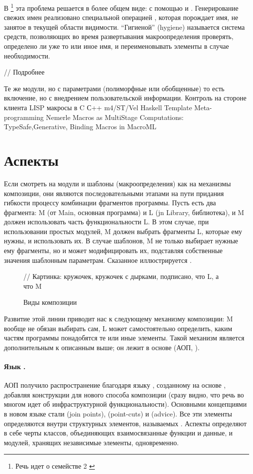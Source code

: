 {В \footnote{Речь идет о семействе  2 \cite{???}} эта проблема решается в более общем виде: с помощью  и . Генерирование свежих имен реализовано специальной операцией , которая порождает имя, не занятое в текущей области видимости. ``Гигиеной'' (hygiene) называется система средств, позволяющих во время развертывания макроопределения проверять, определено ли уже то или иное имя, и переименовывать элементы в случае необходимости.

// Подробнее



Те же модули, но с параметрами (полиморфные или обобщенные)
	то есть включение, но с внедрением пользовательской информации. Контроль на стороне клиента
	LISP
	макросы в C
	С++
	m4/ST/Vel
	Haskell Template Meta-programming
	Nemerle
	Macros as MultiStage Computations: TypeSafe,Generative, Binding Macros in MacroML
}	
\section{Аспекты}

Если смотреть на модули и шаблоны (макроопределения) как на механизмы композиции, они являются последовательными этапами на пути придания гибкости процессу комбинации фрагментов программы. Пусть есть два фрагмента: M (от Main, основная программа) и L (jn Library, библиотека), и M должен использовать часть функциональности L. В этом случае, при использовании простых модулей, M должен выбрать фрагменты L, которые ему нужны, и использовать их. В случае шаблонов, M не только выбирает нужные ему фрагменты, но и может модифицировать их, подставляя собственные значения шаблонным параметрам. Сказанное иллюстрируется .

\begin{figure}[htbp]
// Картинка: кружочек, кружочек с дырками, подписано, что L, а что M
\caption{Виды композиции}\label{Composition}
\end{figure}

Развитие этой линии приводит нас к следующему механизму композиции: M вообще не обязан выбирать сам, L может самостоятельно определить, каким частям программы понадобятся те или иные элементы. Такой механизм является дополнительным к описанным выше; он лежит в основе  (АОП, \cite{???}).

\paragraph*{Язык .} АОП получило распространение благодаря языку  \cite{???}, созданному на основе , добавляя конструкции для нового способа композиции (сразу видно, что речь во многом идет об инфраструктурной функциональности). Основными концепциями в новом языке стали  (join points),  (point-cuts) и  (advice). Все эти элементы определяются внутри структурных элементов, называемых . Аспекты определяют в себе черты классов, объединяющих взаимосвязанные функции и данные, и модулей, хранящих независимые элементы, одновременно.

